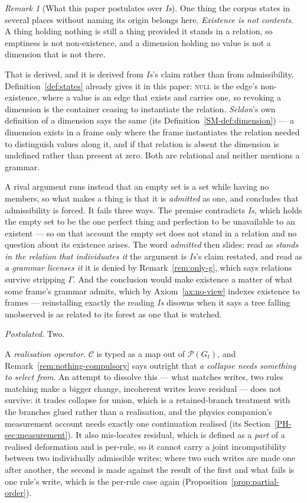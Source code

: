 \documentclass[11pt,a4paper]{article}
\theoremstyle{remark}\newtheorem{remark}[definition]{Remark}
\newcommand{\Poss}{\mathcal{P}}
\newcommand{\Coll}{\mathcal{C}}
\begin{document}
\begin{remark}[What this paper postulates over \emph{Is}]
One thing the corpus states in several places without naming its origin belongs here.
\emph{Existence is not contents.} A thing holding
nothing is still a thing provided it stands in a relation, so emptiness is not non-existence, and a
dimension holding no value is not a dimension that is not there.

That is derived, and it is derived from \emph{Is}'s claim rather than from admissibility.
Definition~\ref{def:states} already gives it in this paper: \textsc{null} is the edge's non-existence,
where a value is an edge that exists and carries one, so revoking a dimension is the container ceasing
to instantiate the relation. \emph{Seldon}'s own definition of a dimension says the same (its Definition~\ref{SM-def:dimension}) --- a
dimension exists in a frame only where the frame instantiates the relation needed to distinguish values
along it, and if that relation is absent the dimension is undefined rather than present at zero. Both
are relational and neither mentions a grammar.

A rival argument runs instead that an empty set is a set while having no members, so what makes a
thing is that it is \emph{admitted} as one, and concludes that admissibility is forced. It fails three ways. The premise contradicts \emph{Is}, which holds the empty set to
be the one perfect thing and perfection to be unavailable to an existent --- so on that account the
empty set does not stand in a relation and no question about its existence arises. The word
\emph{admitted} then slides: read as \emph{stands in the relation that individuates it} the argument is
\emph{Is}'s claim restated, and read as \emph{a grammar licenses it} it is denied by
Remark~\ref{rem:only-g}, which says relations survive stripping $\Gamma$. And the conclusion would make
existence a matter of what some frame's grammar admits, which by Axiom~\ref{ax:no-view} indexes
existence to frames --- reinstalling exactly the reading \emph{Is} disowns when it says a tree
falling unobserved is as related to its forest as one that is watched.

\emph{Postulated.} Two.

A \emph{realisation operator}. $\Coll$ is typed as a map out of $\Poss(G_t)$, and
Remark~\ref{rem:nothing-compulsory} says outright that \emph{a collapse needs something to select
from}. An attempt to dissolve this --- what matches writes, two rules matching make a bigger change,
incoherent writes leave residual --- does not survive: it trades collapse for union, which is a
retained-branch treatment with the branches glued rather than a realisation, and the physics companion's
measurement account needs exactly one continuation realised
(its Section~\ref{PH-sec:measurement}). It also mis-locates residual, which is
defined as a \emph{part} of a realised deformation and is per-rule, so it cannot carry a joint
incompatibility between two individually admissible writes; where two such writes are made one after
another, the second is made against the result of the first and what fails is one rule's write, which
is the per-rule case again (Proposition~\ref{prop:partial-order}).


\end{remark}
\end{document}
